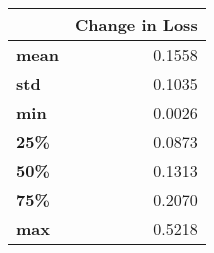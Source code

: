 \begin{tabular}{lr}
\toprule
{} &  Change in Loss \\
\midrule
\textbf{mean} &          0.1558 \\
\textbf{std } &          0.1035 \\
\textbf{min } &          0.0026 \\
\textbf{25\% } &          0.0873 \\
\textbf{50\% } &          0.1313 \\
\textbf{75\% } &          0.2070 \\
\textbf{max } &          0.5218 \\
\bottomrule
\end{tabular}
